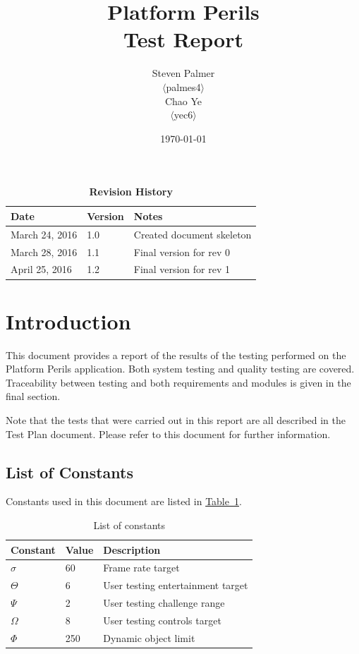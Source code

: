 \documentclass[12pt, titlepage]{article}
\begin{document}
\title{\bf Platform Perils\\[\baselineskip]\Large Test Report}
\author{Steven Palmer\\$\langle$palmes4$\rangle$\\Chao Ye\\$\langle$yec6$\rangle$}
\date{\today}
	
\maketitle

\tableofcontents
\listoftables
\listoffigures


\begin{table}[bp]
\caption*{\bf Revision History}
\begin{tabularx}{\textwidth}{p{3.5cm}p{2cm}X}
\toprule {\bf Date} & {\bf Version} & {\bf Notes}\\
\midrule
March 24, 2016 & 1.0 & Created document skeleton\\
March 28, 2016 & 1.1 & Final version for rev 0\\
April 25, 2016 & 1.2 & Final version for rev 1\\
\bottomrule
\end{tabularx}
\end{table}

\newpage



\section{Introduction}

This document provides a report of the results of the testing performed on the Platform Perils application.  Both system testing and quality testing are covered. Traceability between testing and both requirements and modules is given in the final section.

Note that the tests that were carried out in this report are all described in the Test Plan document.  Please refer to this document for further information.

\subsection{List of Constants}
Constants used in this document are listed in \hyperref[tab:constants]{Table~\ref*{tab:constants}}.
\begin{table}[ht]
\caption{List of constants} \label{tab:constants}
\begin{tabularx}{\textwidth}{p{3cm}p{2cm}X}
\toprule {\bf Constant} & {\bf Value} & {\bf Description}\\
\midrule
$\sigma$ & 60 & Frame rate target\\
$\Theta$ & 6 & User testing entertainment target\\
$\Psi$ & 2 & User testing challenge range\\
$\Omega$ & 8 & User testing controls target\\
$\Phi$ & 250 & Dynamic object limit\\
\bottomrule
\end{tabularx}
\end{table}
\end{document}
